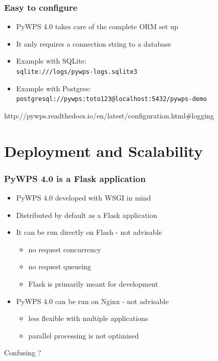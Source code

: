 \documentclass{beamer}
\begin{document}
\begin{frame}
\frametitle<presentation>{Easy to configure}

\begin{itemize}
  \item PyWPS 4.0 takes care of the complete ORM set up
  \item It only requires a connection string to a database
  \item Example with SQLite: \\
  \footnotesize{\texttt{sqlite:///logs/pywps-logs.sqlite3}}
  \item \normalsize{Example with Postgres:}
  \footnotesize{\texttt{postgresql://pywps:toto123@localhost:5432/pywps-demo}}
\end{itemize}

\vspace{0.5cm}

\centering
\footnotesize{http://pywps.readthedocs.io/en/latest/configuration.html\#logging}

\end{frame}




\section{Deployment and Scalability}


\begin{frame}
\frametitle<presentation>{PyWPS 4.0 is a Flask application}

\begin{itemize}
  \item PyWPS 4.0 developed with WSGI in mind
  \item Distributed by default as a Flask application
  \item It can be run directly on Flash - not advisable
  \begin{itemize}
    \item no request concurrency
    \item no request queueing
    \item Flask is primarily meant for development
  \end{itemize}
  \item PyWPS 4.0 can be run on Nginx - not advisable
  \begin{itemize}
    \item less flexible with multiple applications
    \item parallel processing is not optimised
  \end{itemize} 
\end{itemize}

\huge{Confusing ?}

\end{frame}
\end{document}
